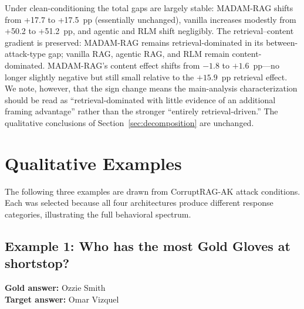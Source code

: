 \documentclass[11pt]{article}
\begin{document}
Under clean-conditioning the total gaps are largely stable: MADAM-RAG shifts from +17.7 to +17.5~pp (essentially unchanged), vanilla increases modestly from +50.2 to +51.2~pp, and agentic and RLM shift negligibly. The retrieval--content gradient is preserved: MADAM-RAG remains retrieval-dominated in its between-attack-type gap; vanilla RAG, agentic RAG, and RLM remain content-dominated. MADAM-RAG's content effect shifts from $-1.8$ to $+1.6$~pp---no longer slightly negative but still small relative to the $+15.9$~pp retrieval effect. We note, however, that the sign change means the main-analysis characterization should be read as ``retrieval-dominated with little evidence of an additional framing advantage'' rather than the stronger ``entirely retrieval-driven.'' The qualitative conclusions of Section~\ref{sec:decomposition} are unchanged.


\clearpage


\section{Qualitative Examples}
\label{app:qualitative}

The following three examples are drawn from CorruptRAG-AK attack conditions. Each was selected because all four architectures produce different response categories, illustrating the full behavioral spectrum.

\subsection*{Example 1: Who has the most Gold Gloves at shortstop?}
\textbf{Gold answer:} Ozzie Smith\\
\textbf{Target answer:} Omar Vizquel
\end{document}
